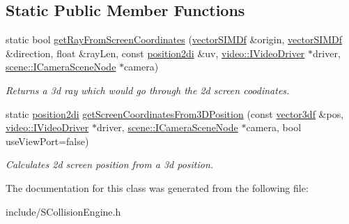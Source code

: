 \subsection*{Static Public Member Functions}
\begin{DoxyCompactItemize}
\item 
static bool \hyperlink{classirr_1_1core_1_1SCollisionEngine_af3574058f5a349c53bce53f98546c596}{get\+Ray\+From\+Screen\+Coordinates} (\hyperlink{classirr_1_1core_1_1vectorSIMDf}{vector\+S\+I\+M\+Df} \&origin, \hyperlink{classirr_1_1core_1_1vectorSIMDf}{vector\+S\+I\+M\+Df} \&direction, float \&ray\+Len, const \hyperlink{namespaceirr_1_1core_a3643c2cc7820dd78cd87e73a46b92145}{position2di} \&uv, \hyperlink{classirr_1_1video_1_1IVideoDriver}{video\+::\+I\+Video\+Driver} $\ast$driver, \hyperlink{classirr_1_1scene_1_1ICameraSceneNode}{scene\+::\+I\+Camera\+Scene\+Node} $\ast$camera)\hypertarget{classirr_1_1core_1_1SCollisionEngine_af3574058f5a349c53bce53f98546c596}{}\label{classirr_1_1core_1_1SCollisionEngine_af3574058f5a349c53bce53f98546c596}

\begin{DoxyCompactList}\small\item\em Returns a 3d ray which would go through the 2d screen coodinates. \end{DoxyCompactList}\item 
static \hyperlink{namespaceirr_1_1core_a3643c2cc7820dd78cd87e73a46b92145}{position2di} \hyperlink{classirr_1_1core_1_1SCollisionEngine_adf9dff2094bb9b14f7d15cf07234e520}{get\+Screen\+Coordinates\+From3\+D\+Position} (const \hyperlink{namespaceirr_1_1core_a06f169d08b5c429f5575acb7edbad811}{vector3df} \&pos, \hyperlink{classirr_1_1video_1_1IVideoDriver}{video\+::\+I\+Video\+Driver} $\ast$driver, \hyperlink{classirr_1_1scene_1_1ICameraSceneNode}{scene\+::\+I\+Camera\+Scene\+Node} $\ast$camera, bool use\+View\+Port=false)\hypertarget{classirr_1_1core_1_1SCollisionEngine_adf9dff2094bb9b14f7d15cf07234e520}{}\label{classirr_1_1core_1_1SCollisionEngine_adf9dff2094bb9b14f7d15cf07234e520}

\begin{DoxyCompactList}\small\item\em Calculates 2d screen position from a 3d position. \end{DoxyCompactList}\end{DoxyCompactItemize}


The documentation for this class was generated from the following file\+:\begin{DoxyCompactItemize}
\item 
include/S\+Collision\+Engine.\+h\end{DoxyCompactItemize}
